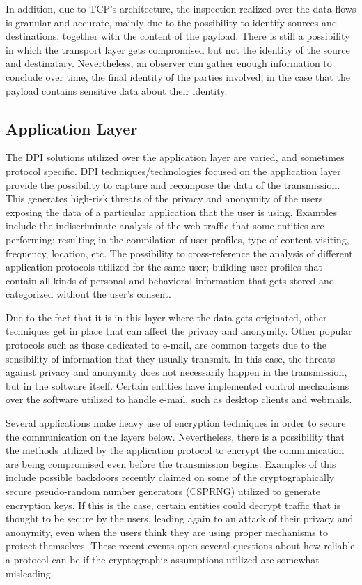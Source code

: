 \documentclass[conference]{IEEEtran}
\begin{document}
In addition, due to TCP's architecture, the inspection
realized over the data flows is granular and accurate, mainly due to
the possibility to identify sources and destinations, together with
the content of the payload. There is still a possibility in which the
transport layer gets compromised but not the identity of the source
and destinatary. Nevertheless, an observer can gather enough
information to conclude over time, the final identity of the parties
involved, in the case that the payload contains sensitive data about their
identity.

\subsection{Application Layer}

The DPI solutions utilized over the application layer are varied, and
sometimes protocol specific\cite{taxo}. DPI techniques/technologies
focused on the application layer provide the possibility to capture
and recompose the data of the transmission. This generates high-risk
threats of the privacy and anonymity of the users exposing the
data of a particular application that the user is using. Examples include
the indiscriminate analysis of the web traffic that some
entities are performing\cite{taxo}; resulting in the compilation
of user profiles, type of content visiting, frequency, location,
etc. The possibility to cross-reference the analysis of different
application protocols utilized for the same user; building user
profiles that contain all kinds of personal and behavioral information
that gets stored and categorized without the user's consent.


Due to the fact that it is in this layer where the data gets originated, other
techniques get in place that can affect the privacy and
anonymity. Other popular protocols such as those dedicated to
e-mail, are common targets due to the sensibility of information that
they usually transmit. In this case, the threats against
privacy and anonymity does not necessarily happen in the transmission,
but in the software itself. Certain entities have implemented
control mechanisms over the software utilized to handle e-mail, such
as desktop clients and webmails.

Several  applications make heavy use of encryption
techniques in order to secure the communication on the layers
below. Nevertheless, there is a possibility that the methods utilized
by the application protocol to encrypt the communication are being
compromised even before the transmission begins. Examples of this include
possible backdoors recently claimed\cite{FS2007} on some of the
cryptographically secure pseudo-random number generators (CSPRNG)
utilized to generate encryption keys. If this is the case, certain
entities could decrypt traffic that is thought to be secure by the users,
leading again to an attack of their privacy and anonymity, even when
the users think they are using proper mechanisms to protect
themselves. These recent events open several questions about how
reliable a protocol can be if the cryptographic assumptions utilized
are somewhat misleading.
\end{document}
